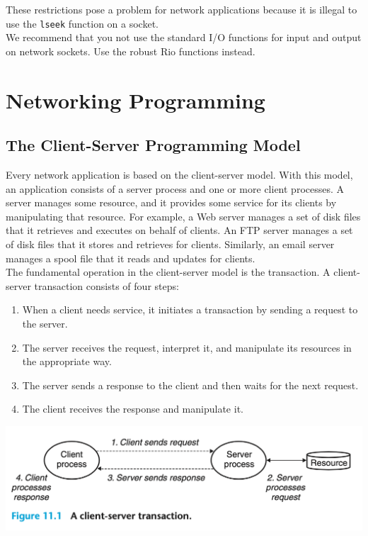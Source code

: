 \documentclass[11pt]{article}
\begin{document}
These restrictions pose a problem for network applications because it is illegal to use the \texttt{lseek} function on a socket.\\

We recommend that you not use the standard I/O functions for input and output on network sockets. Use the robust Rio functions instead.\\


\section{Networking Programming}
\label{sec:org2045397}

\subsection{The Client-Server Programming Model}
\label{sec:orge1c0e4a}
Every network application is based on the client-server model. With this model, an application consists of a server process and one or more client processes. A server manages some resource, and it provides some service for its clients by manipulating that resource. For example, a Web server manages a set of disk files that it retrieves and executes on behalf of clients. An FTP server manages a set of disk files that it stores and retrieves for clients. Similarly, an email server manages a spool file that it reads and updates for clients.\\


The fundamental operation in the client-server model is the transaction. A client-server transaction consists of four steps:\\
\begin{enumerate}
\item When a client needs service, it initiates a transaction by sending a request to the server.\\
\item The server receives the request, interpret it, and manipulate its resources in the appropriate way.\\
\item The server sends a response to the client and then waits for the next request.\\
\item The client receives the response and manipulate it.\\
\end{enumerate}

\begin{center}
\includegraphics[width=.9\linewidth]{pics/figure11.1-client-server.png}
\end{center}
\end{document}
